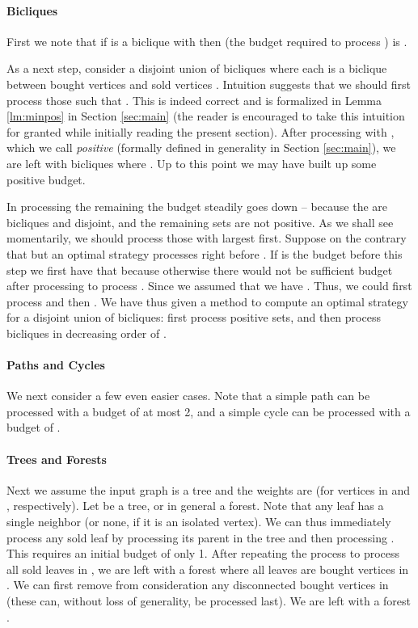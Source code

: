 \documentclass[letterpaper,11pt,abstracton]{scrartcl}
\begin{document}
\paragraph{\textbf{Bicliques}}
First we note that if  is a biclique with  then  (the
budget required to process ) is .

As a next step, consider a disjoint union of bicliques  where each  is a biclique between bought vertices  and
sold vertices .  Intuition suggests that we should first process
those  such that .  This is indeed correct and
is formalized in Lemma \ref{lm:minpos} in Section \ref{sec:main} (the
reader is encouraged to take this intuition for granted while
initially reading the present section).  After processing  with
, which we call \emph{positive} (formally defined in
generality in Section \ref{sec:main}), we are left with bicliques
 where . Up to this point we may have
built up some positive budget.

In processing the remaining  the budget steadily goes down --
because the  are bicliques and disjoint, and the remaining sets
are not positive.  As we shall see momentarily, we should process those  with largest 
first. Suppose on the contrary that  but an optimal
strategy  processes  right before .  If  is the
budget before this step we first have that 
because otherwise there would not be sufficient budget after
processing  to process .  Since we assumed that  we have . Thus, we could first process
 and then .  We have thus given a method to compute an
optimal strategy for a disjoint union of bicliques: first process
positive sets, and then process bicliques in decreasing order of
.

\paragraph{\textbf{Paths and Cycles}}
We next consider a few even easier cases.  Note that a simple
path can be processed with a budget of at most 2, and a simple
cycle can be processed with a budget of .

\paragraph{\textbf{Trees and Forests}}
Next we assume the input graph is a tree and the weights are 
(for vertices in  and , respectively).  Let  be a tree, or in
general a forest. Note that any leaf has a single neighbor (or none,
if it is an isolated vertex).  We can thus immediately process any
sold leaf  by processing its parent in the tree and then processing
.  This requires an initial budget of only 1.  After repeating the
process to process all sold leaves in , we are left with a forest
where all leaves are bought vertices in .  We can first remove from
consideration any disconnected bought vertices in  (these can, without
loss of generality, be processed last).
We are left with a forest .
\end{document}
